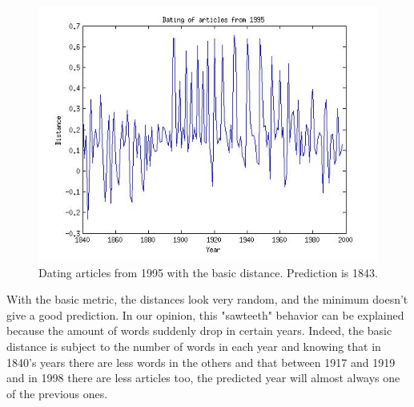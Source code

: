 \begin{figure}[H]
\begin{minipage}[b]{0.3\linewidth}
    \end{minipage}\hfill
    \begin{minipage}[b]{0.3\linewidth}
	\includegraphics[scale=0.25]{Pictures/date_articles/distance1/dating1995_corrected.jpg}
        \caption{Dating articles from 1995 with the basic distance. Prediction is 1843.}
    \end{minipage}
\end{figure}
With the basic metric, the distances look very random, and the minimum doesn't give a good prediction. In our opinion, this "sawteeth" behavior can be explained because the amount of words suddenly drop in certain years. Indeed, the basic distance is subject to the number of words in each year and knowing that in 1840's years there are less words in the others and that between 1917 and 1919 and in 1998 there are less articles too, the predicted year will almost always one of the previous ones.
